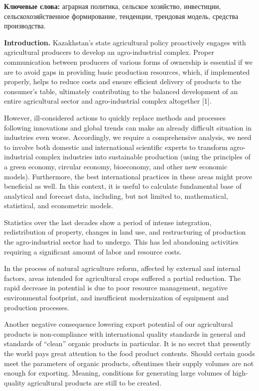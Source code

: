 {\bfseries Ключевые слова:} аграрная политика, сельское хозяйство,
инвестиции, сельскохозяйственное формирование, тенденции, трендовая
модель, средства производства.
\begin{multicols}{2}

{\bfseries Introduction.} Kazakhstan's state agricultural policy
proactively engages with agricultural producers to develop an
agro-industrial complex. Proper communication between producers of
various forms of ownership is essential if we are to avoid gaps in
providing basic production resources, which, if implemented properly,
helps to reduce costs and ensure efficient delivery of products to the
consumer's table, ultimately contributing to the balanced development of
an entire agricultural sector and agro-industrial complex altogether
{[}1{]}.

However, ill-considered actions to quickly replace methods and processes
following innovations and global trends can make an already difficult
situation in industries even worse. Accordingly, we require a
comprehensive analysis, we need to involve both domestic and
international scientific experts to transform agro-industrial complex
industries into sustainable production (using the principles of a green
economy, circular economy, bioeconomy, and other new economic models).
Furthermore, the best international practices in these areas might prove
beneficial as well. In this context, it is useful to calculate
fundamental base of analytical and forecast data, including, but not
limited to, mathematical, statistical, and econometric models.

Statistics over the last decades show a period of intense integration,
redistribution of property, changes in land use, and restructuring of
production the agro-industrial sector had to undergo. This has led
abandoning activities requiring a significant amount of labor and
resource costs.

In the process of natural agriculture reform, affected by external and
internal factors, areas intended for agricultural crops suffered a
partial reduction. The rapid decrease in potential is due to poor
resource management, negative environmental footprint, and insufficient
modernization of equipment and production processes.

Another negative consequence lowering export potential of our
agricultural products is non-compliance with international quality
standards in general and standards of ``clean'' organic products in
particular. It is no secret that presently the world pays great
attention to the food product contents. Should certain goods meet the
parameters of organic products, oftentimes their supply volumes are not
enough for exporting. Meaning, conditions for generating large volumes
of high-quality agricultural products are still to be created.


\end{multicols}
